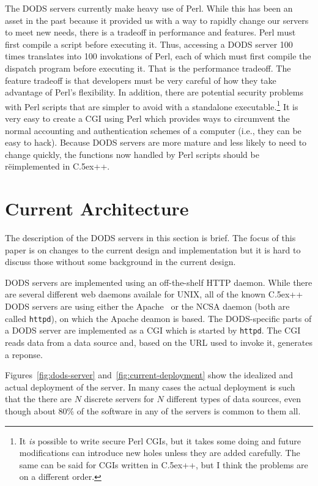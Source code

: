 \documentclass{article}
\newcommand{\httpd}{\texttt{httpd}\xspace}
\newcommand{\Cpp}{\rm {\small C}\raise.5ex\hbox{\footnotesize ++}\xspace}
\begin{document}
  The DODS servers currently make heavy use of Perl. While this has been an
  asset in the past because it provided us with a way to rapidly change our
  servers to meet new needs, there is a tradeoff in performance and features.
  Perl must first compile a script before executing it. Thus, accessing a
  DODS server 100 times translates into 100 invokations of Perl, each of
  which must first compile the dispatch program before executing it. That is
  the performance tradeoff. The feature tradeoff is that developers must be
  very careful of how they take advantage of Perl's flexibility. In addition,
  there are potential security problems with Perl scripts that are simpler to
  avoid with a standalone executable.\footnote{It \emph{is} possible to write
    secure Perl CGIs, but it takes some doing and future modifications can
    introduce new holes unless they are added carefully. The same can be said
    for CGIs written in \Cpp, but I think the problems are on a different
    order.} It is very easy to create a CGI using Perl which provides ways to
  circumvent the normal accounting and authentication schemes of a computer
  (i.e., they can be easy to hack).  Because DODS servers are more mature and
  less likely to need to change quickly, the functions now handled by Perl
  scripts should be r\"eimplemented in \Cpp.

\section{Current Architecture}
\label{sec:arch}

The description of the DODS servers in this section is brief. The focus of
this paper is on changes to the current design and implementation but it is 
hard to discuss those without some background in the current design. 

DODS servers are implemented using an off-the-shelf HTTP daemon. While there
are several different web daemons availale for UNIX, all of the known \Cpp
DODS servers are using either the Apache~\cite{apache:httpd} or the NCSA
daemon (both are called \httpd), on which the Apache deamon is based. The
DODS-specific parts of a DODS server are implemented as a CGI which is
started by \httpd. The CGI reads data from a data source and, based
on the URL used to invoke it, generates a reponse.

Figures~\ref{fig:dods-server} and~\ref{fig:current-deployment} show the
idealized and actual deployment of the server. In many cases the actual
deployment is such that the there are $N$ discrete servers for $N$ different
types of data sources, even though about 80\% of the software in any of the
servers is common to them all.
\end{document}
